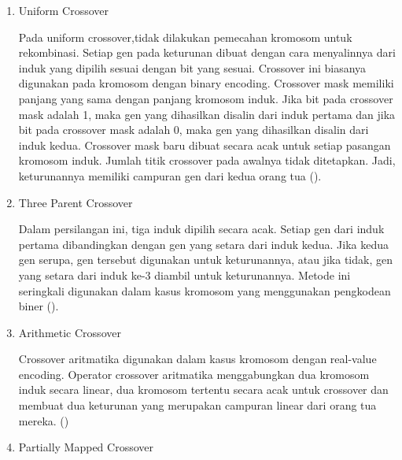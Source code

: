 \begin{enumerate}
\begin{enumerate}[nolistsep]
    Crossover N-point pertama kali diimplementasikan oleh De Jong pada tahun 1975. 
    Crossover ini memiliki banyak titik crossover namun aturan yang digunakan sama dengan yang digunakan pada crossover satu titik. 
    Pada crossover 2 titik, titik \linebreak persilangan adalah 2. 
    Menambahkan lebih banyak titik crossover akan berdampak pada terganggunya blok-blok pembangun yang terkadang mengurangi kinerja\linebreak algoritma genetika. 
    Namun, hal ini memungkinkan bagian kepala dan ekor \linebreak kromosom untuk diterima secara bersamaan pada keturunannya (\cite{Kora}). 
    \item Uniform Crossover
    
    Pada uniform crossover,tidak dilakukan pemecahan kromosom untuk rekombinasi. 
    Setiap gen pada keturunan dibuat dengan cara menyalinnya dari induk yang dipilih sesuai dengan bit yang sesuai. 
    Crossover ini biasanya digunakan pada kromosom dengan binary encoding. 
    Crossover mask memiliki panjang yang sama dengan panjang kromosom induk. 
    Jika bit pada crossover mask adalah 1, maka gen yang dihasilkan disalin dari induk pertama dan jika bit pada crossover mask adalah 0, maka gen yang dihasilkan disalin dari induk kedua. 
    Crossover mask baru dibuat secara acak untuk setiap pasangan kromosom induk. 
    Jumlah titik crossover pada awalnya tidak ditetapkan. 
    Jadi, keturunannya memiliki campuran gen dari kedua orang tua (\cite{Kora}).
    \item Three Parent Crossover
    
    Dalam persilangan ini, tiga induk dipilih secara acak. 
    Setiap gen dari induk pertama dibandingkan dengan gen yang setara dari induk kedua. 
    Jika kedua gen serupa, gen tersebut digunakan untuk keturunannya, atau jika tidak, gen yang setara dari induk ke-3 diambil untuk keturunannya. 
    Metode ini seringkali digunakan dalam kasus kromosom yang menggunakan pengkodean biner (\cite{Kora}).
    \item Arithmetic Crossover
    
    Crossover aritmatika digunakan dalam kasus kromosom dengan real-value encoding. 
    Operator crossover aritmatika menggabungkan dua kromosom induk secara linear, dua kromosom tertentu secara acak untuk crossover dan membuat dua keturunan yang merupakan campuran linear dari orang tua mereka. (\cite{Kora})
  
    \item Partially Mapped Crossover
    

\end{enumerate}
\end{enumerate}
